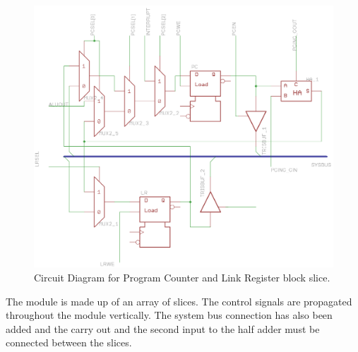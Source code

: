 \begin{figure}
\centering
\includegraphics[width=\textwidth-2.7cm]{../../eagle/PcBlock/PcBlock_slice.png}
\caption{Circuit Diagram for Program Counter and Link Register block slice.}
\label{fig:pc:circuit}
\end{figure}

The module is made up of an array of slices. 
The control signals are propagated throughout the module vertically. 
The system bus connection has also been added and the carry out and the second input to the half adder must be connected between the slices.
